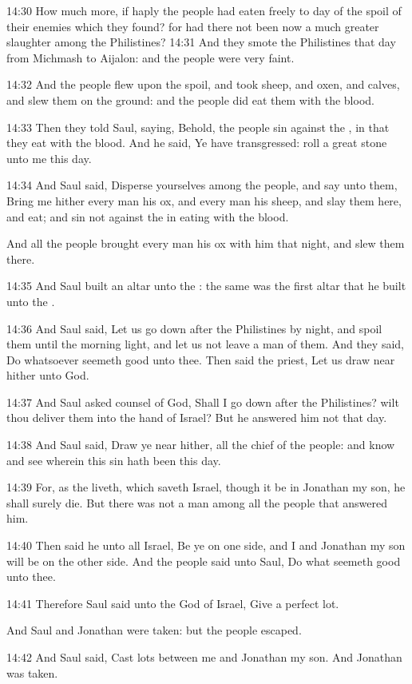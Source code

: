 14:30 How much more, if haply the people had eaten freely to day of
the spoil of their enemies which they found? for had there not been
now a much greater slaughter among the Philistines?  14:31 And they
smote the Philistines that day from Michmash to Aijalon: and the
people were very faint.

14:32 And the people flew upon the spoil, and took sheep, and oxen,
and calves, and slew them on the ground: and the people did eat them
with the blood.

14:33 Then they told Saul, saying, Behold, the people sin against the
\LORD, in that they eat with the blood. And he said, Ye have
transgressed: roll a great stone unto me this day.

14:34 And Saul said, Disperse yourselves among the people, and say
unto them, Bring me hither every man his ox, and every man his sheep,
and slay them here, and eat; and sin not against the \LORD in eating
with the blood.

And all the people brought every man his ox with him that night, and
slew them there.

14:35 And Saul built an altar unto the \LORD: the same was the first
altar that he built unto the \LORD.

14:36 And Saul said, Let us go down after the Philistines by night,
and spoil them until the morning light, and let us not leave a man of
them. And they said, Do whatsoever seemeth good unto thee. Then said
the priest, Let us draw near hither unto God.

14:37 And Saul asked counsel of God, Shall I go down after the
Philistines? wilt thou deliver them into the hand of Israel? But he
answered him not that day.

14:38 And Saul said, Draw ye near hither, all the chief of the people:
and know and see wherein this sin hath been this day.

14:39 For, as the \LORD liveth, which saveth Israel, though it be in
Jonathan my son, he shall surely die. But there was not a man among
all the people that answered him.

14:40 Then said he unto all Israel, Be ye on one side, and I and
Jonathan my son will be on the other side. And the people said unto
Saul, Do what seemeth good unto thee.

14:41 Therefore Saul said unto the \LORD God of Israel, Give a perfect
lot.

And Saul and Jonathan were taken: but the people escaped.

14:42 And Saul said, Cast lots between me and Jonathan my son. And
Jonathan was taken.

